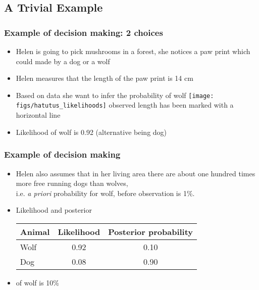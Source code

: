 \documentclass[10pt]{beamer}
\begin{document}
\subsection{A Trivial Example}
\frame{\subsectionpage}

\begin{frame}
\frametitle{Example of decision making: 2 choices}

\begin{itemize}
\item Helen is going to pick mushrooms in a forest,  she notices a paw print which could made by a dog or a wolf
\pause
\item Helen measures that the length of the paw print is 14 cm
\item Based on data she want to infer the probability of wolf
\pause
\texttt{[image: figs/hatutus\_likelihoods]}
  observed length has been marked with a horizontal line
\item Likelihood of wolf is 0.92 (alternative being dog)
\end{itemize}

\end{frame}



\begin{frame}

\frametitle{Example of decision making}

  \begin{itemize}
  \item<+-> Helen also assumes that in her living area there are about one hundred times more free running dogs than wolves,
  \\ i.e. {\em a priori} probability for wolf, before observation is 1\%.
  \item Likelihood and posterior
    \begin{center}\leavevmode
      \begin{tabular}{| l | c c |}
        \hline
        Animal &  Likelihood & Posterior probability \\
        \hline
        Wolf     &  0.92            & 0.10      \\
        Dog    &  0.08        & 0.90    \\
        \hline
      \end{tabular}
    \end{center}
  \item<+->  of wolf is 10\%
  \end{itemize}

\end{frame}
\end{document}
